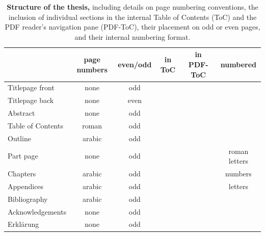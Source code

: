 \begin{table}
	\centering 
	\caption{\textbf{Structure of the thesis,} including details on page numbering conventions, the inclusion of individual sections in the internal Table of Contents (ToC) and the PDF reader's navigation pane (PDF-ToC), their placement on odd or even pages, and their internal numbering format.}
	\label{tab:thesistructure}
	\vspace{5ex}
	\begin{tabular}{lccccc} 
		\toprule
		 & page numbers & even/odd & in ToC & in PDF-ToC & numbered  \\ 
		\midrule 
		Titlepage front  & none & odd & \color{bqred}\XSolidBrush& \color{bqgreen} \CheckmarkBold &\color{bqred} \XSolidBrush\\
		Titlepage back & none & even & \color{bqred}\XSolidBrush& \color{bqred}\XSolidBrush& \color{bqred}\XSolidBrush\\
		Abstract & none & odd & \color{bqred}\XSolidBrush& \color{bqgreen}\CheckmarkBold & \color{bqred}\XSolidBrush\\
		Table of Contents & roman & odd & \color{bqred}\XSolidBrush& \color{bqgreen}\CheckmarkBold &\color{bqred} \XSolidBrush\\
		Outline & arabic & odd &\color{bqgreen} \CheckmarkBold &\color{bqgreen} \CheckmarkBold & \color{bqred}\XSolidBrush\\
		Part page & none & odd & \color{bqgreen}\CheckmarkBold & \color{bqgreen}\CheckmarkBold & roman letters\\
		Chapters & arabic & odd & \color{bqgreen}\CheckmarkBold &\color{bqgreen} \CheckmarkBold & numbers\\
		Appendices & arabic & odd & \color{bqgreen}\CheckmarkBold &\color{bqgreen} \CheckmarkBold & letters\\
		Bibliography & arabic & odd & \color{bqgreen}\CheckmarkBold & \color{bqgreen}\CheckmarkBold & \color{bqred}\XSolidBrush\\
		Acknowledgements & none & odd & \color{bqred}\XSolidBrush& \color{bqgreen}\CheckmarkBold & \color{bqred}\XSolidBrush\\
		Erklärung & none & odd & \color{bqred}\XSolidBrush&\color{bqgreen} \CheckmarkBold & \color{bqred}\XSolidBrush\\
		\bottomrule
	\end{tabular}
\end{table}

